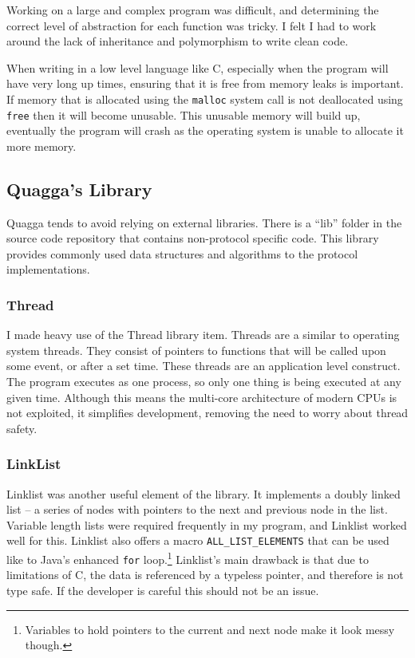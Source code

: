 \documentclass[12pt,a4paper,twoside]{report}
\begin{document}
Working on a large and complex program was difficult, and determining the
correct level of abstraction for each function was tricky.  I felt I had to
work around the lack of inheritance and polymorphism to write clean code. 

When writing in a low level language like C, especially when the program will
have very long up times, ensuring that it is free from memory leaks is
important. If memory that is allocated using the \texttt{malloc} system call is
not deallocated using \texttt{free} then it will become unusable. This unusable
memory will build up, eventually the program will crash as the operating system
is unable to allocate it more memory.

\subsection{Quagga's Library}
Quagga tends to avoid relying on external libraries. There is a ``lib'' folder
in the source code repository that contains non-protocol specific code. This
library provides commonly used data structures and algorithms to the protocol
implementations. 

\subsubsection{Thread}
I made heavy use of the Thread library item. Threads are a similar to operating
system threads. They consist of pointers to functions that will be called upon
some event, or after a set time. These threads are an application level
construct. The program  executes as one process, so only one thing is being
executed at any given time. Although this means the multi-core architecture of
modern CPUs is not exploited, it simplifies development, removing the need to
worry about thread safety.

\subsubsection{LinkList}
Linklist was another useful element of the library. It implements a doubly
linked list -- a series of nodes with pointers to the next and previous node in
the list.  Variable length lists were required frequently in my program, and
Linklist worked well for this. Linklist also offers a macro
\texttt{ALL\_LIST\_ELEMENTS} that can be used like to Java's enhanced
\texttt{for} loop.\footnote{Variables to hold pointers to the current and next
node make it look messy though.} Linklist's main drawback is that due to
limitations of C, the data is referenced by a typeless pointer, and therefore
is not type safe. If the developer is careful this should not be an issue. 
\end{document}
